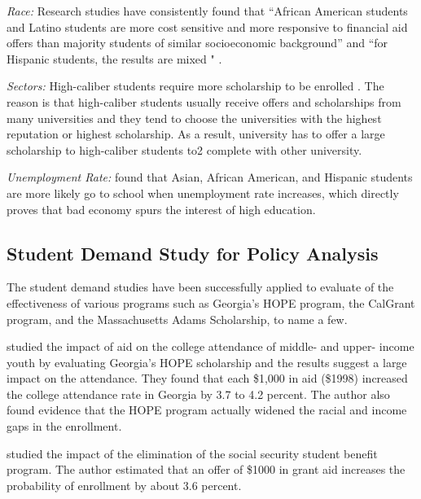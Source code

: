 \documentclass[12pt,english]{report}
\begin{document}
\vspace{0.15in}
\noindent \textit{Race:}  Research studies have consistently found that ``African American 
students and Latino students are more cost sensitive and more responsive to financial aid 
offers than majority students of similar
socioeconomic background''  and ``for Hispanic students, the results are mixed " 
\citet{Hossler1989}.

\vspace{0.15in}
\noindent \textit{Sectors:} High-caliber students require more scholarship to be 
enrolled \citep{chapman1987college}. The reason is that high-caliber students usually 
receive offers and scholarships from many universities and they tend to choose the 
universities with the highest reputation or highest scholarship. As a result, university
has to offer a large scholarship to high-caliber students to2 complete with other university.



\vspace{0.25in}
\noindent \textit{Unemployment Rate:} \citet{Heller1999} found that Asian, African American,
and Hispanic students are more likely go to school when unemployment rate increases, which 
directly proves that bad economy spurs the interest of high education.


\subsection{Student Demand Study for Policy Analysis }

The student demand studies have been successfully applied to evaluate of the effectiveness of 
various programs such as Georgia's HOPE program, the CalGrant program,  and the Massachusetts 
Adams Scholarship, to name a few.

\citet{Dynarski2000} studied the impact of aid on the college attendance of middle- and upper-
income youth by evaluating Georgia's HOPE scholarship and the results suggest a large impact on 
the attendance. They found that each \$1,000 in aid (\$1998) increased the college attendance 
rate in Georgia by 3.7  to 4.2 percent. The author also found evidence that the HOPE program
actually widened the racial and income gaps in the enrollment.


\citet{Dynarski2003} studied the impact of the elimination of the social security student benefit 
program. The author estimated that an offer of \$1000 in grant aid increases the probability of  
enrollment by about 3.6 percent.
\end{document}
